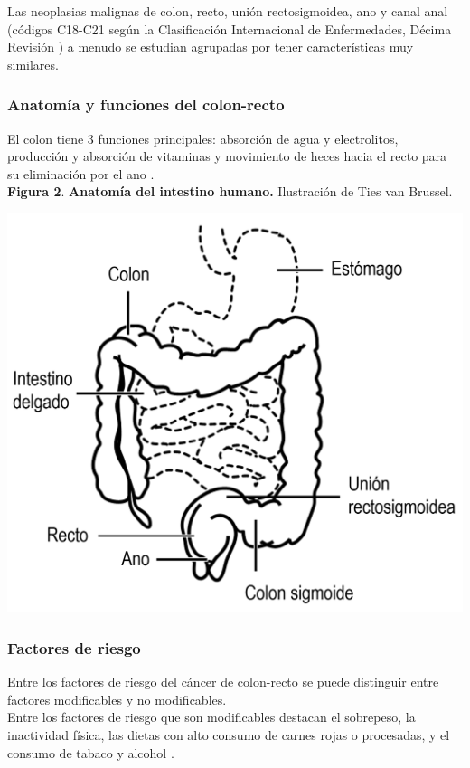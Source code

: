 Las neoplasias malignas de colon, recto, unión rectosigmoidea, ano y canal anal (códigos C18-C21 según la Clasificación Internacional de Enfermedades, Décima Revisión \cite{ICD10, cie10es}) a menudo se estudian agrupadas por tener características muy similares.

\subsubsection{Anatomía y funciones del colon-recto}

El colon tiene 3 funciones principales: absorción de agua y electrolitos, producción y absorción de vitaminas y movimiento de heces hacia el recto para su eliminación por el ano \cite{Azzouz2020}.\\

\newpage
\textbf{Figura 2}. \textbf{Anatomía del intestino humano.} Ilustración de Ties van Brussel.
\begin{center}
	\includegraphics[width=.70\textwidth]{figuras/anatomia_cr.png} \\
\end{center}

\subsubsection{Factores de riesgo}

Entre los factores de riesgo del cáncer de colon-recto se puede distinguir entre factores modificables y no modificables.\\

Entre los factores de riesgo que son modificables destacan el sobrepeso, la inactividad física, las dietas con alto consumo de carnes rojas o procesadas, y el consumo de tabaco y alcohol \cite{AmericanCancerSociety2020}.\\

